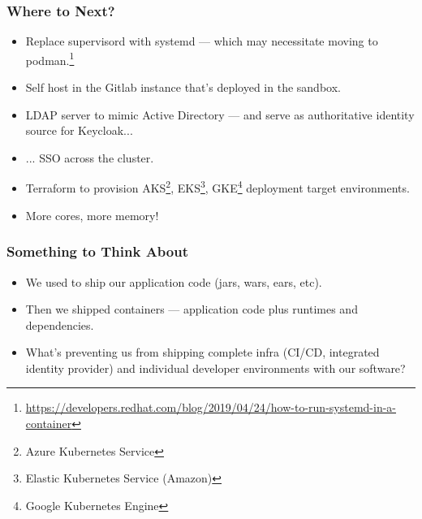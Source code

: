     \begin{frame}
      \frametitle{Where to Next?}
      \begin{itemize}
        \item<2->Replace supervisord with systemd --- which may necessitate
          moving to podman.\footnote<2->{\href{https://developers.redhat.com/blog/2019/04/24/how-to-run-systemd-in-a-container}{https://developers.redhat.com/blog/2019/04/24/how-to-run-systemd-in-a-container}}
        \item<3->Self host in the Gitlab instance that's deployed in the sandbox.
        \item<4->LDAP server to mimic Active Directory --- and serve as
          authoritative identity source for Keycloak...
        \item<5->... SSO across the cluster.
        \item<6->Terraform to provision AKS\footnote<6->{Azure Kubernetes Service},
          EKS\footnote<6->{Elastic Kubernetes Service (Amazon)}, GKE\footnote<6->{Google
            Kubernetes Engine} deployment target environments.
        \item<7->More cores, more memory!
      \end{itemize}
    \end{frame}

    \begin{frame}
      \frametitle{Something to Think About}
      \begin{itemize}
      \item<2->We used to ship our application code (jars, wars, ears, etc).
      \item<3->Then we shipped containers --- application code plus runtimes and dependencies.
      \item<4->What's preventing us from shipping complete infra (CI/CD,
        integrated identity provider) and individual developer environments with our software?
      \end{itemize}
    \end{frame}

